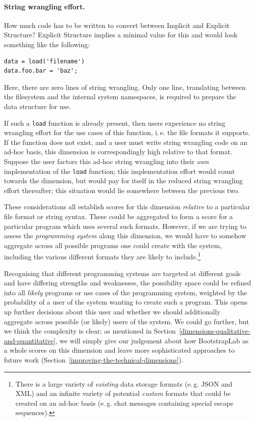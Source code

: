 \documentclass[ twoside,openright,titlepage,numbers=noenddot,headinclude,footinclude,cleardoublepage=empty,abstract=on,
                BCOR=5mm,paper=a4,fontsize=11pt
                ]{scrreprt}
\newcommand{\ie}{i.\,e.}
\newcommand{\eg}{e.\,g.}
\theoremstyle{definition}
\begin{document}
\paragraph{String wrangling effort.}

How much code has to be written to convert between Implicit and Explicit
Structure? Explicit Structure implies a minimal value for this and would
look something like the following:

\begin{verbatim}
data = load('filename')
data.foo.bar = 'baz';
\end{verbatim}

Here, there are zero lines of string wrangling. Only one line,
translating between the filesystem and the internal system namespaces,
is required to prepare the data structure for use.

If such a \texttt{load} function is already present, then users
experience no string wrangling effort for the use cases of this
function, \ie{} the file formats it supports. If the function does not
exist, and a user must write string wrangling code on an ad-hoc basis,
this dimension is correspondingly high relative to that format. Suppose
the user factors this ad-hoc string wrangling into their \emph{own}
implementation of the \texttt{load} function; this implementation effort
would count towards the dimension, but would pay for itself in the
reduced string wrangling effort thereafter; this situation would lie
somewhere between the previous two.

These considerations all establish scores for this dimension
\emph{relative} to a particular file format or string syntax. These
could be aggregated to form a score for a particular program which uses
several such formats. However, if we are trying to assess the
\emph{programming system} along this dimension, we would have to somehow
aggregate across all possible programs one could create with the system,
including the various different formats they are likely to
include.\footnote{There is a large variety of \emph{existing} data
  storage formats (\eg{} JSON and XML) and an infinite variety of
  potential \emph{custom} formats that could be created on an ad-hoc
  basis (\eg{} chat messages containing special escape sequences).}

Recognising that different programming systems are targeted at different
goals and have differing strengths and weaknesses, the possibility space
could be refined into all \emph{likely} programs or use cases of the
programming system, weighted by the probability of a user of the system
wanting to create such a program. This opens up further decisions about
this user and whether we should additionally aggregate across possible
(or likely) users of the system. We could go further, but we think the
complexity is clear; as mentioned in
Section~\ref{dimensions-qualitative-and-quantitative}, we will simply
give our judgement about how BootstrapLab as a whole scores on this
dimension and leave more sophisticated approaches to future work
(Section~\ref{improving-the-technical-dimensions}).
\end{document}
